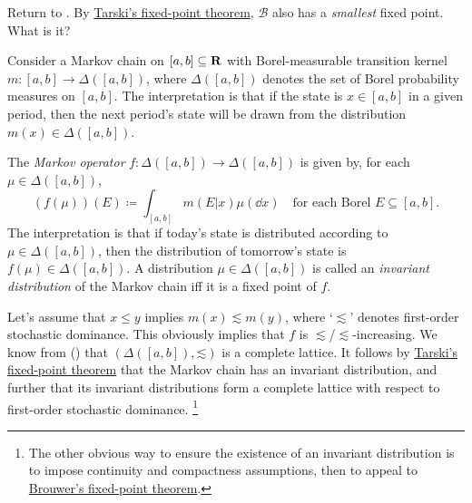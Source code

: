 \begin{exercise}
	\label{exercise:rationalisability_tarski}
	Return to . By \hyperref[theorem:tarski]{Tarski's fixed-point theorem}, $\mathcal{B}$ also has a \emph{smallest} fixed point. What is it?
\end{exercise}

\begin{example}[Markov chains]
	\label{example:markov_ch}
	Consider a Markov chain on $[a,b] \subseteq \mathbf{R}$ with Borel-measurable transition kernel $m : [a,b] \to \Delta([a,b])$, where $\Delta([a,b])$ denotes the set of Borel probability measures on $[a,b]$. The interpretation is that if the state is $x \in [a,b]$ in a given period, then the next period's state will be drawn from the distribution $m(x) \in \Delta([a,b])$.

	The \emph{Markov operator} $f : \Delta([a,b]) \to \Delta([a,b])$ is given by, for each $\mu \in \Delta([a,b])$,
	\begin{equation*}
		(f(\mu))(E) \coloneqq \int_{[a,b]} m(E|x) \mu(\dd x)
		\quad\text{for each Borel $E\subseteq [a,b]$.} 
	\end{equation*}
	The interpretation is that if today's state is distributed according to $\mu \in \Delta([a,b])$, then the distribution of tomorrow's state is $f(\mu) \in \Delta([a,b])$. A distribution $\mu \in \Delta([a,b])$ is called an \emph{invariant distribution} of the Markov chain iff it is a fixed point of $f$.

	Let's assume that $x \leq y$ implies $m(x) \lesssim m(y)$, where `$\lesssim$' denotes first-order stochastic dominance. This obviously implies that $f$ is $\lesssim$/$\lesssim$-increasing. We know from  () that $( \Delta([a,b]), \mathord{\lesssim} )$ is a complete lattice. It follows by \hyperref[theorem:tarski]{Tarski's fixed-point theorem} that the Markov chain has an invariant distribution, and further that its invariant distributions form a complete lattice with respect to first-order stochastic dominance.%
		\footnote{The other obvious way to ensure the existence of an invariant distribution is to impose continuity and compactness assumptions, then to appeal to \hyperref[item:fpt_browuer]{Brouwer's fixed-point theorem}.}
\end{example}

